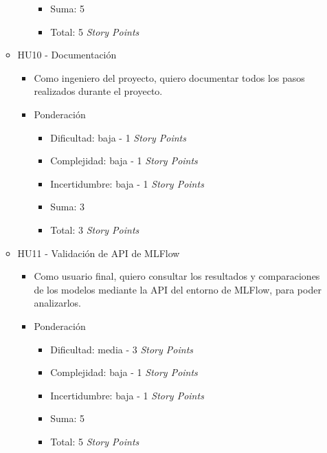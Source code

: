 \documentclass[
11pt, %
]{charter}
\begin{document}
\begin{itemize}
\begin{itemize}
\begin{itemize}
\begin{itemize}
                \item Suma: 5
                \item Total: 5 \textit{Story Points}
            \end{itemize}
        \end{itemize}
      \item HU10 - Documentación
        \begin{itemize}
            \item Como ingeniero del proyecto, quiero documentar todos los pasos realizados durante el proyecto.
            \item Ponderación
            \begin{itemize}
                \item Dificultad: baja - 1 \textit{Story Points}
                \item Complejidad: baja - 1 \textit{Story Points}
                \item Incertidumbre: baja - 1 \textit{Story Points}
                \item Suma: 3
                \item Total: 3 \textit{Story Points}
            \end{itemize}
        \end{itemize}
\newpage        
      \item HU11 - Validación de API de MLFlow
        \begin{itemize}
            \item Como usuario final, quiero consultar los resultados y comparaciones de los modelos mediante la API del entorno de MLFlow, para poder analizarlos.
            \item Ponderación
            \begin{itemize}
                \item Dificultad: media - 3 \textit{Story Points}
                \item Complejidad: baja - 1 \textit{Story Points}
                \item Incertidumbre: baja - 1 \textit{Story Points}
                \item Suma: 5
                \item Total: 5 \textit{Story Points}
            \end{itemize}
        \end{itemize}        
    \end{itemize}
\end{itemize}
\end{document}
